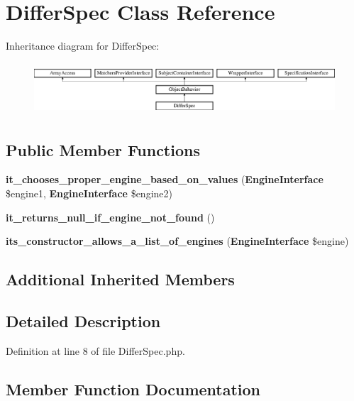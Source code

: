 \section{Differ\+Spec Class Reference}
\label{classspec_1_1_php_spec_1_1_formatter_1_1_presenter_1_1_differ_1_1_differ_spec}
Inheritance diagram for Differ\+Spec\+:\begin{figure}[H]
\begin{center}
\leavevmode
\includegraphics[height=1.953488cm]{classspec_1_1_php_spec_1_1_formatter_1_1_presenter_1_1_differ_1_1_differ_spec}
\end{center}
\end{figure}
\subsection*{Public Member Functions}
\begin{DoxyCompactItemize}
\item 
{\bf it\+\_\+chooses\+\_\+proper\+\_\+engine\+\_\+based\+\_\+on\+\_\+values} ({\bf Engine\+Interface} \$engine1, {\bf Engine\+Interface} \$engine2)
\item 
{\bf it\+\_\+returns\+\_\+null\+\_\+if\+\_\+engine\+\_\+not\+\_\+found} ()
\item 
{\bf its\+\_\+constructor\+\_\+allows\+\_\+a\+\_\+list\+\_\+of\+\_\+engines} ({\bf Engine\+Interface} \$engine)
\end{DoxyCompactItemize}
\subsection*{Additional Inherited Members}


\subsection{Detailed Description}


Definition at line 8 of file Differ\+Spec.\+php.



\subsection{Member Function Documentation}
